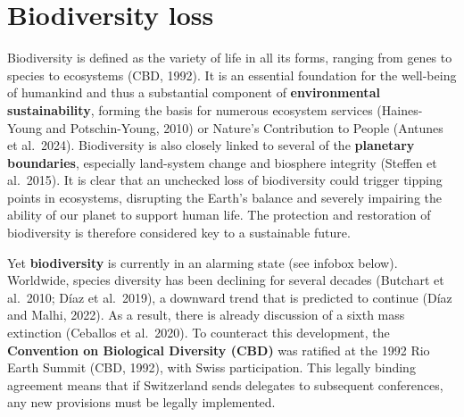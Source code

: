 \documentclass[
  a4paper,
  openany]{book}
\begin{document}
\section{Biodiversity loss}\label{biodiversity-loss}

Biodiversity is defined as the variety of life in all its forms, ranging
from genes to species to ecosystems (CBD, 1992). It is an essential
foundation for the well-being of humankind and thus a substantial
component of \textbf{environmental sustainability}, forming the basis
for numerous ecosystem services (Haines-Young and Potschin-Young, 2010)
or Nature's Contribution to People (Antunes et al.~2024). Biodiversity
is also closely linked to several of the \textbf{planetary boundaries},
especially land-system change and biosphere integrity (Steffen et
al.~2015). It is clear that an unchecked loss of biodiversity could
trigger tipping points in ecosystems, disrupting the Earth's balance and
severely impairing the ability of our planet to support human life. The
protection and restoration of biodiversity is therefore considered key
to a sustainable future.

Yet \textbf{biodiversity} is currently in an alarming state (see infobox
below). Worldwide, species diversity has been declining for several
decades (Butchart et al.~2010; Díaz et al.~2019), a downward trend that
is predicted to continue (Díaz and Malhi, 2022). As a result, there is
already discussion of a sixth mass extinction (Ceballos et al.~2020). To
counteract this development, the \textbf{Convention on Biological
Diversity (CBD)} was ratified at the 1992 Rio Earth Summit (CBD, 1992),
with Swiss participation. This legally binding agreement means that if
Switzerland sends delegates to subsequent conferences, any new
provisions must be legally implemented.
\end{document}
